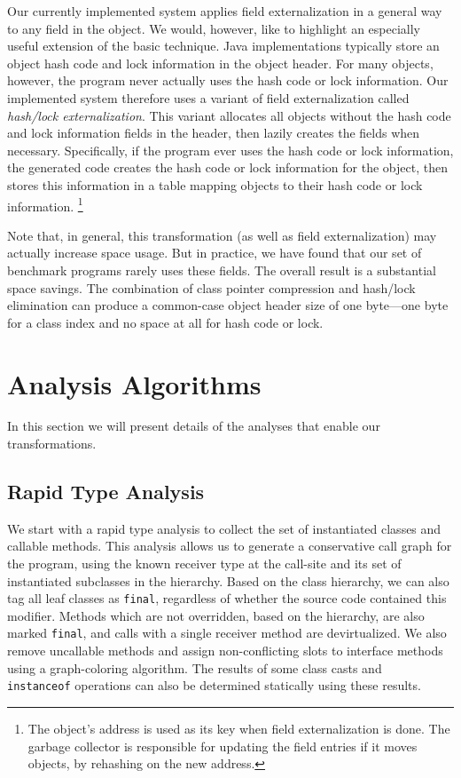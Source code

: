 \documentclass{sig-alt-full}
\begin{document}
Our currently implemented system applies field externalization
in a general way to any field in the object. We would, however,
like to highlight an especially useful extension of the basic
technique. Java implementations typically store an object
hash code and lock information in the object header. For many
objects, however, the program never actually uses the hash code
or lock information. Our implemented system therefore uses
a variant of field externalization called {\em hash/lock 
externalization}. This variant allocates all objects 
without the hash code and lock information fields in the header,
then lazily creates the fields when necessary. 
Specifically, if the program ever uses the hash code or lock information, 
the generated code creates the hash code or lock information
for the object, then stores this information in a table
mapping objects to their hash code or lock information.%
\footnote{The object's address is used as its key when
  field externalization is done.  The garbage collector is responsible
  for updating the field entries if it moves objects, by rehashing on
  the new address.}

Note that, in general, this transformation (as well as field
externalization) may actually increase space usage. But in practice,
we have found that our set of benchmark programs
rarely uses these fields. The overall result is a substantial
space savings. The combination of class pointer compression 
and hash/lock elimination can produce a common-case object header
size of one byte---one byte for a class index and no
space at all for hash code or lock.

\section{Analysis Algorithms}
%
In this section we will present details of the analyses that enable
our transformations.
%
\subsection{Rapid Type Analysis}
We start with a rapid type analysis \cite{bacon96} to collect the set of
instantiated classes and callable methods.  This analysis allows us to generate
a conservative call graph for the program, using the known receiver
type at the call-site and its set of instantiated subclasses in the
hierarchy.  Based on the class hierarchy, we can also tag all leaf
classes as {\tt final}, regardless of whether the source code contained
this modifier.  Methods which are not overridden, based on
the hierarchy, are also marked {\tt final}, and calls with a single
receiver method are devirtualized.  We also remove uncallable methods
and assign non-conflicting slots to interface methods using a
graph-coloring algorithm.  The results of some class casts and {\tt
  instanceof} operations can also be determined statically using
these results.
\end{document}
